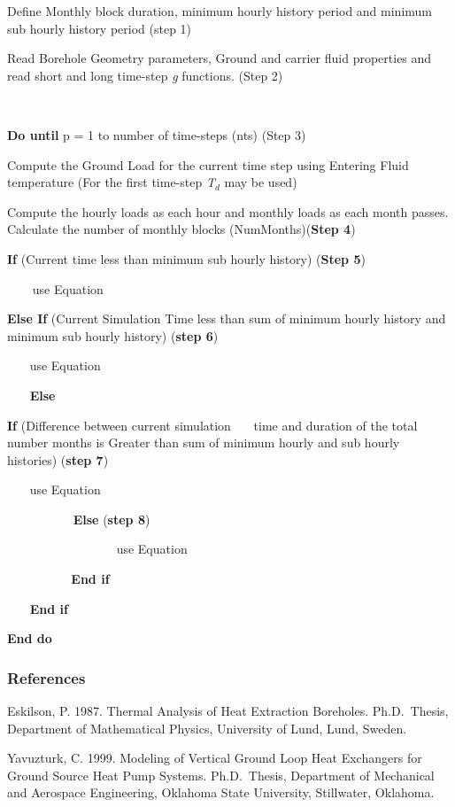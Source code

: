 Define Monthly block duration, minimum hourly history period and minimum sub hourly history period (step 1)

Read Borehole Geometry parameters, Ground and carrier fluid properties and read short and long time-step \emph{g} functions. (Step 2)

\textbf{~}

\textbf{Do until} p = 1 to number of time-steps (nts) (Step 3)

Compute the Ground Load for the current time step using Entering Fluid temperature (For the first time-step \emph{T}\(_{d}\) may be used)

Compute the hourly loads as each hour and monthly loads as each month passes. Calculate the number of monthly blocks (NumMonths)(\textbf{Step 4})

\textbf{If} (Current time less than minimum sub hourly history) (\textbf{Step 5})

\textbf{~~~} use Equation

\textbf{Else If} (Current Simulation Time less than sum of minimum hourly history and minimum sub hourly history) (\textbf{step 6})

~~~ use Equation

~~~ \textbf{Else}

\textbf{If} (Difference between current simulation~~~ time and duration of the total number months is Greater than sum of minimum hourly and sub hourly histories) (\textbf{step 7})

~~~ use Equation

~~~~~~~~~~ \textbf{Else} (\textbf{step 8})

~~~~~~~~~~~~~~~~~ use Equation

~~~ ~~~~~~ \textbf{End if}

~~~ \textbf{End if}

\textbf{End do}

\subsubsection{References}\label{references-2-005}

Eskilson, P. 1987. Thermal Analysis of Heat Extraction Boreholes. Ph.D.~Thesis, Department of Mathematical Physics, University of Lund, Lund, Sweden.

Yavuzturk, C. 1999. Modeling of Vertical Ground Loop Heat Exchangers for Ground Source Heat Pump Systems. Ph.D.~Thesis, Department of Mechanical and Aerospace Engineering, Oklahoma State University, Stillwater, Oklahoma.

